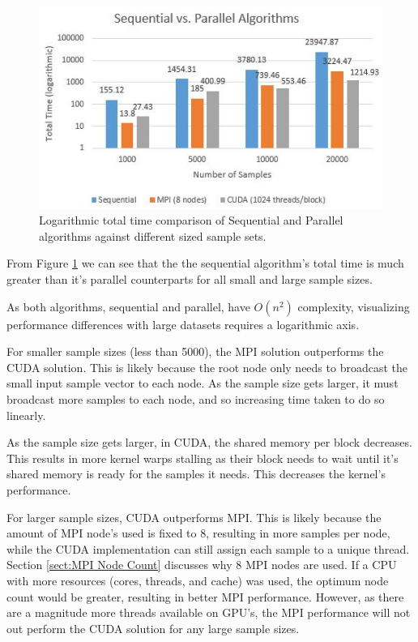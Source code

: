 \documentclass[11pt,a4paper]{article}
\begin{document}
\begin{figure}
\begin{center}
\includegraphics[scale=0.7]{seq_vs_par}
\end{center}
\caption{Logarithmic total time comparison of Sequential and Parallel algorithms against different sized sample sets.}
\label{fig:seq_vs_par}
\end{figure}

From Figure \ref{fig:seq_vs_par} we can see that the the sequential algorithm's total time is much greater than it's parallel counterparts for all small and large sample sizes.

As both algorithms, sequential and parallel, have $O(n^2)$ complexity, visualizing performance differences with large datasets requires a logarithmic axis.

For smaller sample sizes (less than 5000), the MPI solution outperforms the CUDA solution. This is likely because the root node only needs to broadcast the small input sample vector to each node. As  the sample size gets larger, it must broadcast more samples to each node, and so increasing time taken to do so linearly. 

As the sample size gets larger, in CUDA, the shared memory per block decreases. This results in more kernel warps stalling as their block needs to wait until it's shared memory is ready for the samples it needs. This decreases the kernel's performance. 

For larger sample sizes, CUDA outperforms MPI. This is likely because the amount of MPI node's used is fixed to 8, resulting in more samples per node, while the CUDA implementation can still assign each sample to a unique thread. Section \ref{sect:MPI Node Count} discusses why 8 MPI nodes are used. If a CPU with more resources (cores, threads, and cache) was used, the optimum node count would be greater, resulting in better MPI performance. However, as there are a magnitude more threads available on GPU's, the MPI performance will not out perform the CUDA solution for any large sample sizes.
\end{document}
